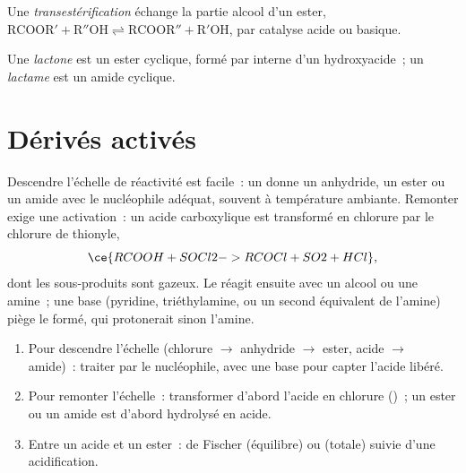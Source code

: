 \begin{definition}[Transestérification]\label{def:b2:acyl-substitution:transesterification}
Une \emph{transestérification} échange la partie alcool d'un ester,
$\mathrm{RCOOR' + R''OH \rightleftharpoons RCOOR'' + R'OH}$, par catalyse acide ou basique.
\end{definition}

\begin{definition}\label{def:b2:acyl-substitution:lactone}
Une \emph{lactone} est un ester cyclique, formé par  interne d'un
hydroxyacide~; un \emph{lactame} est un amide cyclique.
\end{definition}

\section{Dérivés activés}

Descendre l'échelle de réactivité est facile~: un  donne un anhydride, un ester ou
un amide avec le nucléophile adéquat, souvent à température ambiante. Remonter exige une
activation~: un acide carboxylique est transformé en chlorure par le chlorure de thionyle,
\[
  \ce{RCOOH + SOCl2 -> RCOCl + SO2 + HCl} ,
\]
dont les sous-produits sont gazeux. Le  réagit ensuite avec un alcool ou une
amine~; une base (pyridine, triéthylamine, ou un second équivalent de l'amine) piège le 
formé, qui protonerait sinon l'amine.

\begin{method}\label{met:b2:acyl-substitution:ladder}
\begin{enumerate}
  \item Pour descendre l'échelle (chlorure $\to$ anhydride $\to$ ester, acide $\to$ amide)~: traiter
        par le nucléophile, avec une base pour capter l'acide libéré.
  \item Pour remonter l'échelle~: transformer d'abord l'acide en chlorure ()~; un ester ou
        un amide est d'abord hydrolysé en acide.
  \item Entre un acide et un ester~:  de Fischer (équilibre) ou 
        (totale) suivie d'une acidification.
\end{enumerate}
\end{method}

